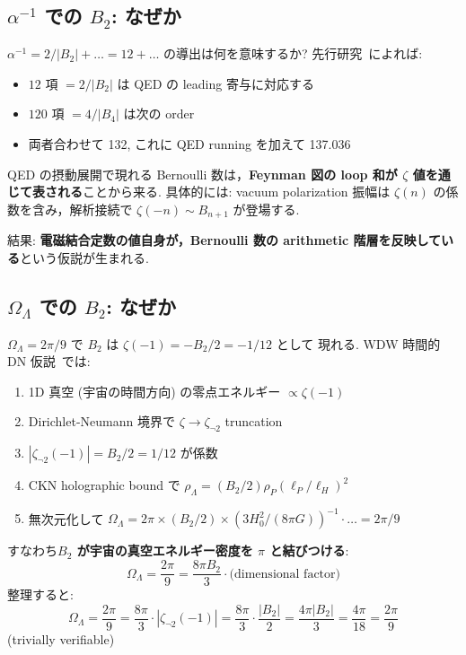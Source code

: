 \documentclass[11pt,a4paper]{article}
\begin{document}
\subsection{$\alpha^{-1}$ での $B_2$: なぜか}

$\alpha^{-1} = 2/|B_2| + \ldots = 12 + \ldots$ の導出は何を意味するか?
先行研究~\cite{alphaArithmetic}によれば:
\begin{itemize}
\item $12$ 項 $= 2/|B_2|$ は QED の leading 寄与に対応する
\item $120$ 項 $= 4/|B_4|$ は次の order
\item 両者合わせて 132, これに QED running を加えて 137.036
\end{itemize}

QED の摂動展開で現れる Bernoulli 数は，\textbf{Feynman 図の
loop 和が $\zeta$ 値を通じて表される}ことから来る. 具体的には:
vacuum polarization 振幅は $\zeta(n)$ の係数を含み，解析接続で
$\zeta(-n) \sim B_{n+1}$ が登場する.

結果: \textbf{電磁結合定数の値自身が，Bernoulli 数の arithmetic
階層を反映している}という仮説が生まれる.

\subsection{$\Omega_\Lambda$ での $B_2$: なぜか}

$\Omega_\Lambda = 2\pi/9$ で $B_2$ は $\zeta(-1) = -B_2/2 = -1/12$ として
現れる. WDW 時間的 DN 仮説~\cite{WDW-DN-paper}では:

\begin{enumerate}
\item 1D 真空 (宇宙の時間方向) の零点エネルギー $\propto \zeta(-1)$
\item Dirichlet-Neumann 境界で $\zeta \to \zeta_{\neg 2}$ truncation
\item $|\zeta_{\neg 2}(-1)| = B_2/2 = 1/12$ が係数
\item CKN holographic bound で $\rho_\Lambda = (B_2/2) \rho_P (\ell_P/\ell_H)^2$
\item 無次元化して $\Omega_\Lambda = 2\pi \times (B_2/2) \times (3 H_0^2/(8\pi G))^{-1} \cdot \ldots = 2\pi/9$
\end{enumerate}

すなわち\textbf{$B_2$ が宇宙の真空エネルギー密度を $\pi$ と結びつける}:
\begin{equation}
\Omega_\Lambda = \frac{2\pi}{9} = \frac{8\pi B_2}{3} \cdot \text{(dimensional factor)}
\end{equation}
整理すると:
\begin{equation}
\boxed{\Omega_\Lambda = \frac{2\pi}{9} = \frac{8\pi}{3} \cdot |\zeta_{\neg 2}(-1)| = \frac{8\pi}{3} \cdot \frac{|B_2|}{2} = \frac{4\pi |B_2|}{3} = \frac{4\pi}{18} = \frac{2\pi}{9}}
\end{equation}
(trivially verifiable)
\end{document}
